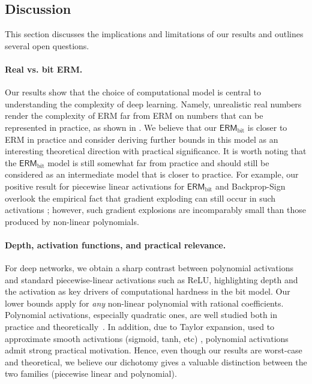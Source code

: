 \documentclass{article}
\theoremstyle{plain}
\theoremstyle{definition}
\theoremstyle{remark}
\begin{document}
\subsection{Discussion}
This section discusses the implications and limitations of our results and outlines several open questions.

\paragraph*{Real vs. bit ERM.}
Our results show that the choice of computational model is central to understanding the complexity of deep learning. Namely, unrealistic real numbers render the complexity of ERM far from ERM on numbers that can be represented in practice, as shown in . We believe that our $\mathsf{ERM}_{\text{bit}}$ is closer to ERM in practice and consider deriving further bounds in this model as an interesting theoretical direction with practical significance. 
It is worth noting that  the $\mathsf{ERM}_{\text{bit}}$ model is still somewhat far from practice and should still be considered as an intermediate model that is closer to practice. 
For example, our positive result for piecewise linear activations for $\mathsf{ERM}_{\text{bit}}$ and Backprop-Sign overlook the empirical fact that gradient exploding can still occur in such activations \cite{DBLP:books/daglib/0040158}; however, such gradient explosions are incomparably small than those produced by non-linear polynomials.  


\paragraph*{Depth, activation functions, and practical relevance.}
For deep networks, we obtain a sharp contrast between polynomial activations and standard piecewise-linear activations such as ReLU, highlighting depth and the activation as key drivers of computational hardness in the bit model. 
Our lower bounds apply for {\em any} non-linear polynomial with rational coefficients. Polynomial activations, especially quadratic ones, are well studied both in practice and theoretically~\cite{soltani2019fast, DBLP:conf/colt/Allen-ZhuL23, blondel2017multi, livni2014computational, sarao2020optimization, bartan2021neural, du2018power, soltanolkotabi2018theoretical}. In addition, due to Taylor expansion, used to approximate smooth activations (sigmoid, tanh, etc) \cite{roheda2024volterra}, polynomial activations admit strong practical motivation. Hence, even though our results are worst-case and theoretical, we believe our dichotomy gives a valuable distinction between the two families (piecewise linear and polynomial). 
\end{document}
